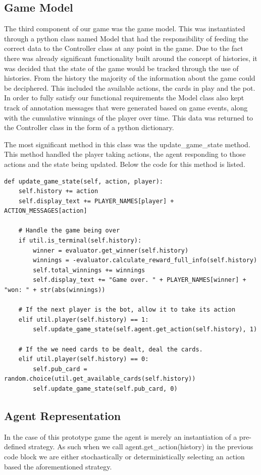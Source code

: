 \subsection{Game Model}\label{subsec:gameModel}
The third component of our game was the game model.
This was instantiated through a python class named Model that had the responsibility of feeding
the correct data to the Controller class at any point in the game.
Due to the fact there was already significant functionality built around the concept of histories,
it was decided that the state of the game would be tracked through the use of histories.
From the history the majority of the information about the game could be deciphered.
This included the available actions, the cards in play and the pot.
In order to fully satisfy our functional requirements the Model class also kept track of annotation messages
that were generated based on game events, along with the cumulative winnings of the player over time.
This data was returned to the Controller class in the
form of a python dictionary.

The most significant method in this class was the update\_game\_state method.
This method handled the player taking actions, the agent responding to those actions and the state being
updated.
Below the code for this method is listed.

\begin{lstlisting}[style=Python]
def update_game_state(self, action, player):
    self.history += action
    self.display_text += PLAYER_NAMES[player] + ACTION_MESSAGES[action]

    # Handle the game being over
    if util.is_terminal(self.history):
        winner = evaluator.get_winner(self.history)
        winnings = -evaluator.calculate_reward_full_info(self.history)
        self.total_winnings += winnings
        self.display_text += "Game over. " + PLAYER_NAMES[winner] + "won: " + str(abs(winnings))

    # If the next player is the bot, allow it to take its action
    elif util.player(self.history) == 1:
        self.update_game_state(self.agent.get_action(self.history), 1)

    # If the we need cards to be dealt, deal the cards.
    elif util.player(self.history) == 0:
        self.pub_card = random.choice(util.get_available_cards(self.history))
        self.update_game_state(self.pub_card, 0)
\end{lstlisting}

\subsection{Agent Representation}\label{subsec:agent}
In the case of this prototype game the agent is merely an instantiation of a pre-defined strategy.
As such when we call agent.get\_action(history) in the previous code block we are either stochastically
or deterministically selecting an action based the aforementioned strategy.


